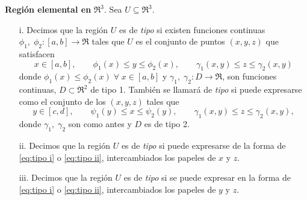 \begin{definition}
    \textbf{Regi\'on elemental en }$\Re^3$.
    Sea $U\subseteq\Re^3$.
    \begin{enumerate}
        \item[i.]
        Decimos que la regi\'on $U$ es de \textit{tipo}  si existen funciones continuas $\phi_1,\;\phi_2:[a,b]\to\Re$ tales que $U$ es el conjunto de puntos $(x,y,z)$ que satisfacen
        \begin{equation} \label{eq:tipo i}
            x\in[a,b], \qquad \phi_1(x)\leq y\leq\phi_2(x), \qquad \gamma_1(x,y)\leq z\leq\gamma_2(x,y) 
        \end{equation}
        donde $\phi_1(x)\leq\phi_2(x)\;\forall\;x\in[a,b]$ y $\gamma_1,\;\gamma_2:D\to\Re$, son funciones continuas, $D\subset\Re^2$ de tipo 1. Tambi\'en se llamar\'a de \textit{tipo}  si puede expresarse como el conjunto de los $(x,y,z)$ tales que
        \begin{equation} \label{eq:tipo ii}
            y\in[c,d], \qquad \psi_1(y)\leq x\leq\psi_2(y), \qquad \gamma_1(x,y)\leq z\leq\gamma_2(x,y), 
        \end{equation}
        donde $\gamma_1,\;\gamma_2$ son como antes y $D$ es de tipo 2.
        \item[ii.]
        Decimos que la regi\'on $U$ es de \textit{tipo}  si puede expresarse de la forma de \eqref{eq:tipo i} o \eqref{eq:tipo ii}, intercambiados los papeles de $x$ y $z$.
        \item[iii.]
        Decimos que la regi\'on $U$ es de \textit{tipo}  si se puede expresar en la forma de \eqref{eq:tipo i} o \eqref{eq:tipo ii}, intercambiados los papeles de $y$ y $z$.
        \end{enumerate}
\end{definition}
